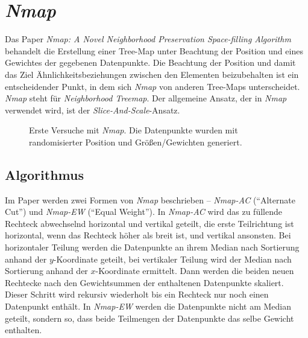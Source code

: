\documentclass[12pt, ngerman, utf8]{article}
\begin{document}
\section{\textit{Nmap}}
Das Paper \textit{Nmap: A Novel Neighborhood Preservation Space-filling Algorithm}\cite{nmap} behandelt die Erstellung einer Tree-Map unter Beachtung der Position und eines Gewichtes der gegebenen Datenpunkte.
Die Beachtung der Position und damit das Ziel Ähnlichkeitsbeziehungen zwischen den Elementen beizubehalten ist ein entscheidender Punkt, in dem sich \textit{Nmap} von anderen Tree-Maps unterscheidet.
\textit{Nmap} steht für \textit{Neighborhood Treemap}. Der allgemeine Ansatz, der in \textit{Nmap} verwendet wird, ist der \textit{Slice-And-Scale}-Ansatz. 

\begin{figure}[h]
    \noindent
    \caption{Erste Versuche mit \emph{Nmap}. Die Datenpunkte wurden mit randomisierter Position und Größen/Gewichten generiert.}
    \label{fig:nmap-one}
\end{figure}

\subsection{Algorithmus}
Im Paper \cite{nmap} werden zwei Formen von \textit{Nmap} beschrieben -- \textit{Nmap-AC} (``Alternate Cut'') und \textit{Nmap-EW} (``Equal Weight'').
In \textit{Nmap-AC} wird das zu füllende Rechteck abwechselnd horizontal und vertikal geteilt, die erste Teilrichtung ist horizontal, wenn das Rechteck höher als breit ist, und vertikal ansonsten. Bei horizontaler Teilung werden die Datenpunkte an ihrem Median nach Sortierung anhand der $y$-Koordinate geteilt, bei vertikaler Teilung wird der Median nach Sortierung anhand der $x$-Koordinate ermittelt. Dann werden die beiden neuen Rechtecke nach den Gewichtsummen der enthaltenen Datenpunkte skaliert. Dieser Schritt wird rekursiv wiederholt bis ein Rechteck nur noch einen Datenpunkt enthält. In \textit{Nmap-EW} werden die Datenpunkte nicht am Median geteilt, sondern so, dass beide Teilmengen der Datenpunkte das selbe Gewicht enthalten.
\end{document}
